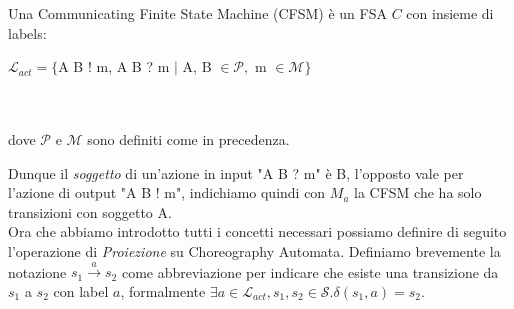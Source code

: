 \begin{definition} \label{def:CommunicatingFiniteStateMachine}
    Una Communicating Finite State Machine (CFSM) è un FSA $C$ con insieme di labels: \bigskip \\
    \centerline{$\mathcal{L}_{act} = \{$A B ! m, A B ? m $|$ A, B $ \in \mathcal{P},$ m $ \in \mathcal{M}\}$}
    \\ \\
    dove $\mathcal{P}$ e $\mathcal{M}$ sono definiti come in precedenza.
\end{definition}
Dunque il \emph{soggetto} di un'azione in input "A B ? m" è B, l'opposto vale per l'azione di output "A B ! m", indichiamo quindi con $M_a$ la CFSM che ha solo transizioni con soggetto A.\\
Ora che abbiamo introdotto tutti i concetti necessari possiamo definire di seguito l'operazione di \emph{Proiezione} su Choreography Automata.
Definiamo brevemente la notazione $s_1 \xrightarrow{a} s_{2}$ come abbreviazione per indicare che esiste una transizione da $s_1$ a $s_2$ con label $a$, formalmente $\exists a \in \mathcal{L}_{act}, s_1, s_2 \in \mathcal{S}. \delta(s_1, a) = s_2$.

